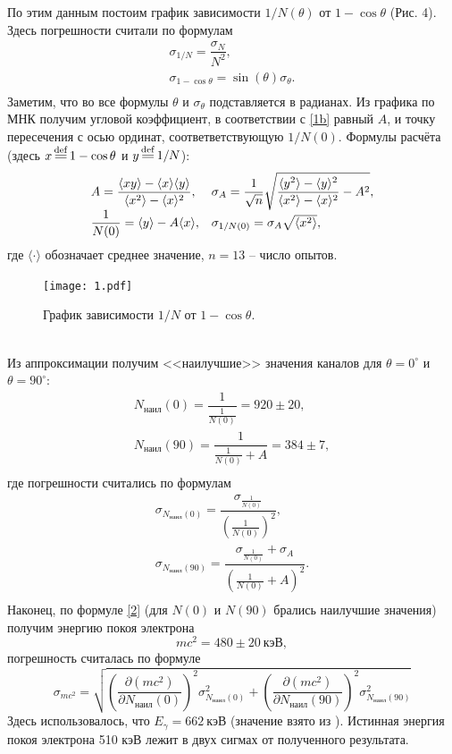 \documentclass[a4paper,12pt]{article}
\theoremstyle{definition}
\newcommand*{\eqdef}{\mathop{\overset{\mathrm{def}}{\resizebox{\widthof{\ensuremath{\mathop{\overset{\mathrm{def}}{=}}}}}{\heightof{=}}{=}}}}
\begin{document}
По этим данным постоим график зависимости $1/N(\theta)$ от $1-\cos \theta$ (Рис. 4). Здесь погрешности считали по формулам
\[\begin{array}{l}
\sigma_{1/N} = \dfrac{\sigma_N}{N^2},\\
\sigma_{1-\cos \theta} = \sin(\theta) \sigma_\theta.\\
\end{array}\]
Заметим, что во все формулы $\theta$ и $\sigma_\theta$ подставляется в радианах. Из графика по МНК получим угловой коэффициент, в соответствии с \eqref{1b} равный $A$, и точку пересечения с осью ординат, соответветствующую $1/N(0)$. Формулы расчёта (здесь $x \eqdef 1 -\cos\theta$ и $y \eqdef 1/N$):
\[\begin{array}{l l}
A = \dfrac{\langle xy \rangle - \langle x \rangle \langle y \rangle}{\langle x^2 \rangle - \langle x \rangle^2}, & \sigma_A = \dfrac{1}{\sqrt{n}}\sqrt{\dfrac{\langle y^2 \rangle - \langle y \rangle^2}{\langle x^2 \rangle - \langle x \rangle^2} - A^2},\\
\dfrac{1}{N(0)} = \langle y \rangle - A \langle x \rangle, & \sigma_{1/N(0)} = \sigma_A \sqrt{\langle x^2\rangle},\\
\end{array}\]
где $\langle \cdot \rangle$ обозначает среднее значение, $n = 13$ -- число опытов.
\begin{figure}[h]
\texttt{[image: 1.pdf]}
\centering
\caption{График зависимости $1/N$ от $1-\cos \theta$.}
\end{figure}\\
Из аппроксимации получим <<наилучшие>> значения каналов для $\theta = 0^\circ$ и $\theta = 90^\circ$:
\[\begin{array}{l}
N_{\text{наил}}(0) = \dfrac{1}{\frac{1}{N(0)}} = 920 \pm 20,\\[12pt]
N_{\text{наил}}(90) = \dfrac{1}{\frac{1}{N(0)}+A} = 384 \pm 7,\\
\end{array}
\]
где погрешности считались по формулам
\[
\begin{array}{l}
\sigma_{N_{\text{наил}}(0)} = \dfrac{\sigma_{\frac{1}{N(0)}}}{(\frac{1}{N(0)})^2},\\[14pt]
\sigma_{N_{\text{наил}}(90)} = \dfrac{\sigma_{\frac{1}{N(0)}} + \sigma_{A}}{(\frac{1}{N(0)}+A)^2}.\\
\end{array}
\]
Наконец, по формуле \eqref{2} (для $N(0)$ и $N(90)$ брались наилучшие значения) получим энергию покоя электрона
\[mc^2 = 480 \pm 20~\text{кэВ},\]
погрешность считалась по формуле
\[\sigma_{mc^2} = \sqrt{ \left( \dfrac{\partial (mc^2)}{\partial N_{\text{наил}}(0)} \right)^2 \sigma_{N_{\text{наил}}(0)}^2 +\left( \dfrac{\partial (mc^2)}{\partial N_{\text{наил}}(90)} \right)^2 \sigma_{N_{\text{наил}}(90)}^2 }\]
Здесь использовалось, что $E_\gamma = 662~\text{кэВ}$ (значение взято из \cite{laba}). Истинная энергия покоя электрона 510 кэВ лежит в двух сигмах от полученного результата.
\end{document}
